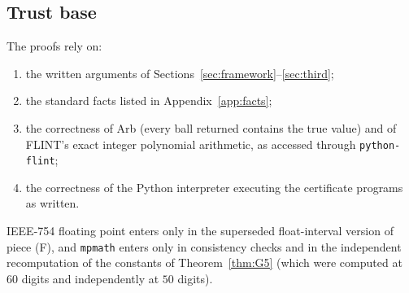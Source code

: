 \subsection{Trust base}
The proofs rely on:
\begin{enumerate}
\item the written arguments of Sections~\ref{sec:framework}--\ref{sec:third};
\item the standard facts listed in Appendix~\ref{app:facts};
\item the correctness of Arb (every ball returned contains the true value) and of FLINT's exact integer polynomial
arithmetic, as accessed through \texttt{python-flint};
\item the correctness of the Python interpreter executing the certificate programs as written.
\end{enumerate}
IEEE-754 floating point enters only in the superseded float-interval version of piece (F), and \texttt{mpmath} enters only
in consistency checks and in the independent recomputation of the constants of Theorem~\ref{thm:G5} (which were computed
at $60$ digits and independently at $50$ digits).
